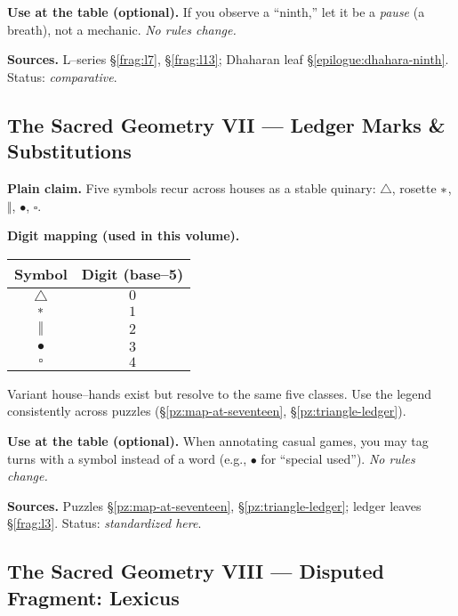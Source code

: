 \documentclass[11pt]{article}
\begin{document}
\begin{itemize}
\medskip
\noindent\textbf{Use at the table (optional).} If you observe a “ninth,” let it be a \emph{pause} (a breath), not a mechanic. \emph{No rules change.}

\medskip
\noindent\textbf{Sources.} L–series \S\ref{frag:l7}, \S\ref{frag:l13}; Dhaharan leaf \S\ref{epilogue:dhahara-ninth}. Status: \emph{comparative}.

\subsection{The Sacred Geometry VII — Ledger Marks \& Substitutions}
\label{konmetry:ledger-marks}
{}

\noindent\textbf{Plain claim.} Five symbols recur across houses as a stable quinary: \(\triangle\), rosette \(\large\ast\), \(\Vert\), \(\bullet\), \(\square\).

\medskip
\noindent\textbf{Digit mapping (used in this volume).}
\begin{center}
\begin{tabular}{c|c}
\textbf{Symbol} & \textbf{Digit (base–5)} \\
\hline
\(\triangle\) & \(0\) \\
\(\large\ast\) & \(1\) \\
\(\Vert\) & \(2\) \\
\(\bullet\) & \(3\) \\
\(\square\) & \(4\) \\
\end{tabular}
\end{center}
Variant house–hands exist but resolve to the same five classes. Use the legend consistently across puzzles (\S\ref{pz:map-at-seventeen}, \S\ref{pz:triangle-ledger}).

\medskip
\noindent\textbf{Use at the table (optional).} When annotating casual games, you may tag turns with a symbol instead of a word (e.g., \(\bullet\) for “special used”). \emph{No rules change.}

\medskip
\noindent\textbf{Sources.} Puzzles \S\ref{pz:map-at-seventeen}, \S\ref{pz:triangle-ledger}; ledger leaves \S\ref{frag:l3}. Status: \emph{standardized here}.

\subsection{The Sacred Geometry VIII — Disputed Fragment: Lexicus}
\label{konmetry:lexicus-disputed}
{}


\end{itemize}
\end{document}
